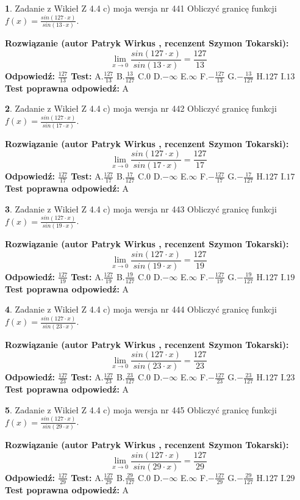 \documentclass[12pt, a4paper]{article}
\theoremstyle{definition} %
\newtheorem{zad}{}
\newcommand{\zadStart}[1]{\begin{zad}#1\newline}
\newcommand{\zadStop}{\end{zad}}
\newcommand{\rozwStart}[2]{\noindent \textbf{Rozwiązanie (autor #1 , recenzent #2): }\newline}
\newcommand{\rozwStop}{\newline}
\newcommand{\odpStart}{\noindent \textbf{Odpowiedź:}\newline}
\newcommand{\odpStop}{\newline}
\newcommand{\testStart}{\noindent \textbf{Test:}\newline}
\newcommand{\testStop}{\newline}
\newcommand{\kluczStart}{\noindent \textbf{Test poprawna odpowiedź:}\newline}
\newcommand{\kluczStop}{\newline}
\begin{document}
\zadStart{Zadanie z Wikieł Z 4.4 c) moja wersja nr 441}
Obliczyć granicę funkcji $f(x)=\frac{sin(127\cdot x)}{sin(13\cdot x)}$.
\zadStop
\rozwStart{Patryk Wirkus}{Szymon Tokarski}
$$\lim\limits_{x\to 0}\frac{sin(127\cdot x)}{sin(13\cdot x)}=
\frac{127}{13}$$
\rozwStop
\odpStart
$\frac{127}{13}$
\odpStop
\testStart
A.$\frac{127}{13}$
B.$\frac{13}{127}$
C.$0$
D.$-\infty$
E.$\infty$
F.$-\frac{127}{13}$
G.$-\frac{13}{127}$
H.$127$
I.$13$
\testStop
\kluczStart
A
\kluczStop



\zadStart{Zadanie z Wikieł Z 4.4 c) moja wersja nr 442}
Obliczyć granicę funkcji $f(x)=\frac{sin(127\cdot x)}{sin(17\cdot x)}$.
\zadStop
\rozwStart{Patryk Wirkus}{Szymon Tokarski}
$$\lim\limits_{x\to 0}\frac{sin(127\cdot x)}{sin(17\cdot x)}=
\frac{127}{17}$$
\rozwStop
\odpStart
$\frac{127}{17}$
\odpStop
\testStart
A.$\frac{127}{17}$
B.$\frac{17}{127}$
C.$0$
D.$-\infty$
E.$\infty$
F.$-\frac{127}{17}$
G.$-\frac{17}{127}$
H.$127$
I.$17$
\testStop
\kluczStart
A
\kluczStop



\zadStart{Zadanie z Wikieł Z 4.4 c) moja wersja nr 443}
Obliczyć granicę funkcji $f(x)=\frac{sin(127\cdot x)}{sin(19\cdot x)}$.
\zadStop
\rozwStart{Patryk Wirkus}{Szymon Tokarski}
$$\lim\limits_{x\to 0}\frac{sin(127\cdot x)}{sin(19\cdot x)}=
\frac{127}{19}$$
\rozwStop
\odpStart
$\frac{127}{19}$
\odpStop
\testStart
A.$\frac{127}{19}$
B.$\frac{19}{127}$
C.$0$
D.$-\infty$
E.$\infty$
F.$-\frac{127}{19}$
G.$-\frac{19}{127}$
H.$127$
I.$19$
\testStop
\kluczStart
A
\kluczStop



\zadStart{Zadanie z Wikieł Z 4.4 c) moja wersja nr 444}
Obliczyć granicę funkcji $f(x)=\frac{sin(127\cdot x)}{sin(23\cdot x)}$.
\zadStop
\rozwStart{Patryk Wirkus}{Szymon Tokarski}
$$\lim\limits_{x\to 0}\frac{sin(127\cdot x)}{sin(23\cdot x)}=
\frac{127}{23}$$
\rozwStop
\odpStart
$\frac{127}{23}$
\odpStop
\testStart
A.$\frac{127}{23}$
B.$\frac{23}{127}$
C.$0$
D.$-\infty$
E.$\infty$
F.$-\frac{127}{23}$
G.$-\frac{23}{127}$
H.$127$
I.$23$
\testStop
\kluczStart
A
\kluczStop



\zadStart{Zadanie z Wikieł Z 4.4 c) moja wersja nr 445}
Obliczyć granicę funkcji $f(x)=\frac{sin(127\cdot x)}{sin(29\cdot x)}$.
\zadStop
\rozwStart{Patryk Wirkus}{Szymon Tokarski}
$$\lim\limits_{x\to 0}\frac{sin(127\cdot x)}{sin(29\cdot x)}=
\frac{127}{29}$$
\rozwStop
\odpStart
$\frac{127}{29}$
\odpStop
\testStart
A.$\frac{127}{29}$
B.$\frac{29}{127}$
C.$0$
D.$-\infty$
E.$\infty$
F.$-\frac{127}{29}$
G.$-\frac{29}{127}$
H.$127$
I.$29$
\testStop
\kluczStart
A
\kluczStop
\end{document}
